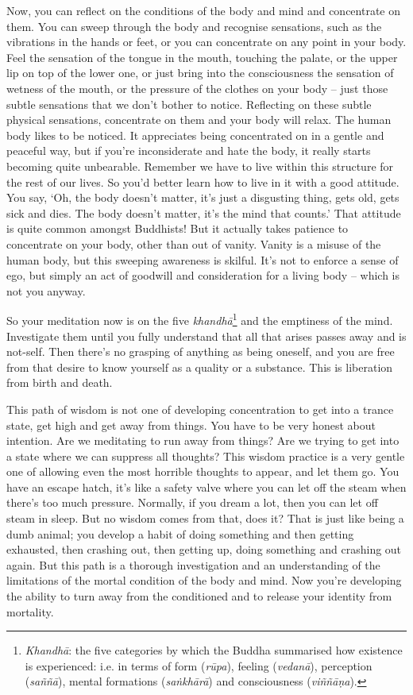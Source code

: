 Now, you can reflect on the conditions of the body and mind and concentrate on them. You can sweep through the body and recognise sensations, such as the vibrations in the hands or feet, or you can concentrate on any point in your body. Feel the sensation of the tongue in the mouth, touching the palate, or the upper lip on top of the lower one, or just bring into the consciousness the sensation of wetness of the mouth, or the pressure of the clothes on your body -- just those subtle sensations that we don't bother to notice. Reflecting on these subtle physical sensations, concentrate on them and your body will relax. The human body likes to be noticed. It appreciates being concentrated on in a gentle and peaceful way, but if you're inconsiderate and hate the body, it really starts becoming quite unbearable. Remember we have to live within this structure for the rest of our lives. So you'd better learn how to live in it with a good attitude. You say, `Oh, the body doesn't matter, it's just a disgusting thing, gets old, gets sick and dies. The body doesn't matter, it's the mind that counts.' That attitude is quite common amongst Buddhists! But it actually takes patience to concentrate on your body, other than out of vanity. Vanity is a misuse of the human body, but this sweeping awareness is skilful. It's not to enforce a sense of ego, but simply an act of goodwill and consideration for a living body -- which is not you anyway.

So your meditation now is on the five \textit{khandhā}\footnote{\textit{Khandhā}: the five categories by which the Buddha summarised how existence is experienced: i.e. in terms of form (\textit{rūpa}), feeling (\textit{vedanā}), perception (\textit{saññā}), mental formations (\textit{saṅkhārā}) and consciousness (\textit{viññāṇa}).} and the emptiness of the mind. Investigate them until you fully understand that all that arises passes away and is not-self. Then there's no grasping of anything as being oneself, and you are free from that desire to know yourself as a quality or a substance. This is liberation from birth and death.

This path of wisdom is not one of developing concentration to get into a trance state, get high and get away from things. You have to be very honest about intention. Are we meditating to run away from things? Are we trying to get into a state where we can suppress all thoughts? This wisdom practice is a very gentle one of allowing even the most horrible thoughts to appear, and let them go. You have an escape hatch, it's like a safety valve where you can let off the steam when there's too much pressure. Normally, if you dream a lot, then you can let off steam in sleep. But no wisdom comes from that, does it? That is just like being a dumb animal; you develop a habit of doing something and then getting exhausted, then crashing out, then getting up, doing something and crashing out again. But this path is a thorough investigation and an understanding of the limitations of the mortal condition of the body and mind. Now you're developing the ability to turn away from the conditioned and to release your identity from mortality.

